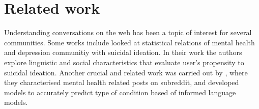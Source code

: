 \section{Related work}
Understanding conversations on the web has been a topic of interest for several communities. 
Some works include \cite{DeChoudhury2014,DeChoudhury2016} looked at statistical relations of mental health and depression communitiy with suicidal ideation. In their work the authors explore linguistic and social characteristics that evaluate user's propensity to suicidal ideation. 
Another crucial and related work was carried out by \cite{gkotsis2017characterisation}, where they characterised mental health related posts on subreddit, and developed models to accurately predict type of condition based of informed language models.